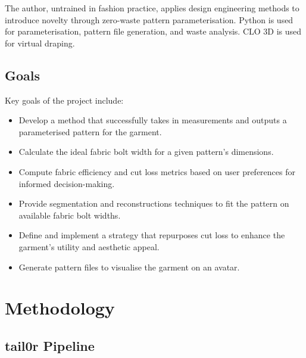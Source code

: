 The author, untrained in fashion practice, applies design engineering methods to introduce novelty through zero-waste pattern parameterisation. Python is used for parameterisation, pattern file generation, and waste analysis. CLO 3D is used for virtual draping.

\subsection{Goals}
Key goals of the project include:
\begin{itemize}
    \item Develop a method that successfully takes in measurements and outputs a parameterised pattern for the garment.
    \item Calculate the ideal fabric bolt width for a given pattern's dimensions.
    \item Compute fabric efficiency and cut loss metrics based on user preferences for informed decision-making.
    \item Provide segmentation and reconstructions techniques to fit the pattern on available fabric bolt widths.
    \item Define and implement a strategy that repurposes cut loss to enhance the garment's utility and aesthetic appeal.
    \item Generate pattern files to visualise the garment on an avatar.
\end{itemize}

\section{Methodology}

\subsection{tail0r Pipeline}

